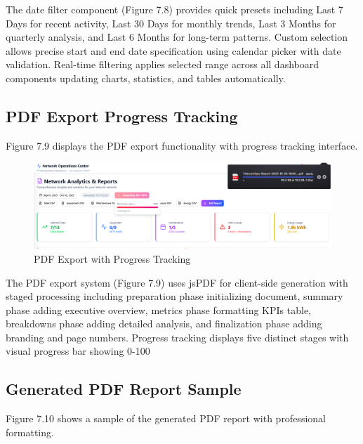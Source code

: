 The date filter component (Figure 7.8) provides quick presets including Last 7 Days for recent activity, Last 30 Days for monthly trends, Last 3 Months for quarterly analysis, and Last 6 Months for long-term patterns. Custom selection allows precise start and end date specification using calendar picker with date validation. Real-time filtering applies selected range across all dashboard components updating charts, statistics, and tables automatically.

\subsection{PDF Export Progress Tracking}

Figure 7.9 displays the PDF export functionality with progress tracking interface.

\begin{figure}[H]
    \centering
    \includegraphics[width=1\linewidth]{img/chap_07/screenshot_pdf_export.png}
    \caption{PDF Export with Progress Tracking}
    \label{fig:pdf_export}
\end{figure}

The PDF export system (Figure 7.9) uses jsPDF for client-side generation with staged processing including preparation phase initializing document, summary phase adding executive overview, metrics phase formatting KPIs table, breakdowns phase adding detailed analysis, and finalization phase adding branding and page numbers. Progress tracking displays five distinct stages with visual progress bar showing 0-100%

\subsection{Generated PDF Report Sample}

Figure 7.10 shows a sample of the generated PDF report with professional formatting.

